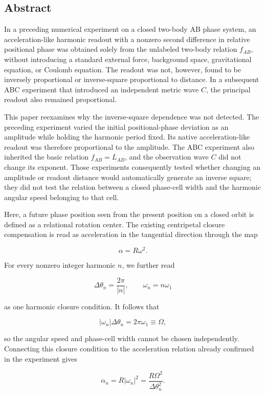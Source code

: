 \documentclass[
  a4paper,
]{article}
\begin{document}
\subsection{Abstract}\label{abstract}

In a preceding numerical experiment on a closed two-body AB phase
system, an acceleration-like harmonic readout with a nonzero second
difference in relative positional phase was obtained solely from the
unlabeled two-body relation \(f_{AB}\), without introducing a standard
external force, background space, gravitational equation, or Coulomb
equation. The readout was not, however, found to be inversely
proportional or inverse-square proportional to distance. In a subsequent
ABC experiment that introduced an independent metric wave \(C\), the
principal readout also remained proportional.

This paper reexamines why the inverse-square dependence was not
detected. The preceding experiment varied the initial positional-phase
deviation as an amplitude while holding the harmonic period fixed. Its
native acceleration-like readout was therefore proportional to the
amplitude. The ABC experiment also inherited the basic relation
\(f_{AB}=L_{AB}\), and the observation wave \(C\) did not change its
exponent. Those experiments consequently tested whether changing an
amplitude or readout distance would automatically generate an inverse
square; they did not test the relation between a closed phase-cell width
and the harmonic angular speed belonging to that cell.

Here, a future phase position seen from the present position on a closed
orbit is defined as a relational rotation center. The existing
centripetal closure compensation is read as acceleration in the
tangential direction through the map

\[
\alpha=R\omega^2.
\]

For every nonzero integer harmonic \(n\), we further read

\[
\Delta\theta_n=\frac{2\pi}{|n|},
\qquad
\omega_n=n\omega_1
\]

as one harmonic closure condition. It follows that

\[
|\omega_n|\Delta\theta_n
=2\pi\omega_1
\equiv\Omega,
\]

so the angular speed and phase-cell width cannot be chosen
independently. Connecting this closure condition to the acceleration
relation already confirmed in the experiment gives

\[
\alpha_n
=R|\omega_n|^2
=\frac{R\Omega^2}{\Delta\theta_n^2}.
\]
\end{document}
